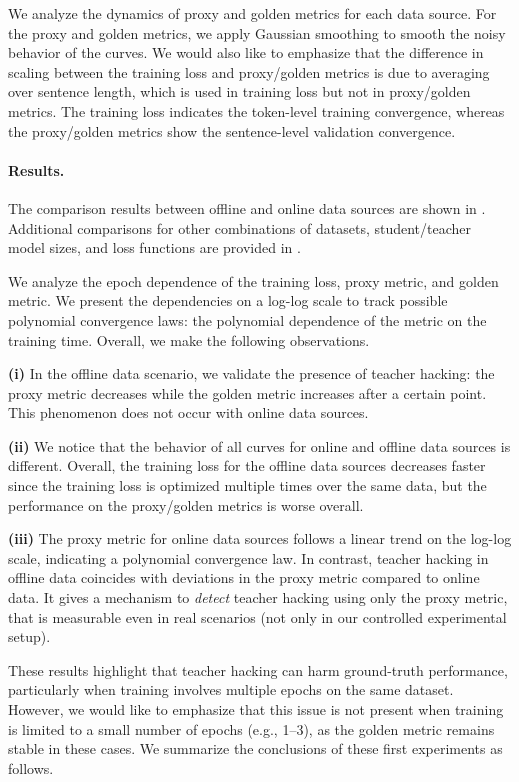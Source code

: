 We analyze the dynamics of proxy and golden metrics for each data source. For the proxy and golden metrics, we apply Gaussian smoothing to smooth the noisy behavior of the curves. We would also like to emphasize that the difference in scaling between the training loss and proxy/golden metrics is due to averaging over sentence length, which is used in training loss but not in proxy/golden metrics. The training loss indicates the token-level training convergence, whereas the proxy/golden metrics show the sentence-level validation convergence.   


\paragraph{Results.} 

The comparison results between offline and online data sources are shown in . Additional comparisons for other combinations of datasets, student/teacher model sizes, and loss functions are provided in .


We analyze the epoch dependence of the training loss, proxy metric, and golden metric. We present the dependencies on a log-log scale to track possible polynomial convergence laws: the polynomial dependence of the metric on the training time. Overall, we make the following observations.


\textbf{(i)} In the offline data scenario, we validate the presence of teacher hacking: the proxy metric decreases while the golden metric increases after a certain point. This phenomenon does not occur with online data sources.

\textbf{(ii)} We notice that the behavior of all curves for online and offline data sources is different. Overall, the training loss for the offline data sources decreases faster since the training loss is optimized multiple times over the same data, but the performance on the proxy/golden metrics is worse overall.

\textbf{(iii)} The proxy metric for online data sources follows a linear trend on the log-log scale, indicating a polynomial convergence law. In contrast, teacher hacking in offline data coincides with deviations in the proxy metric compared to online data. It gives a mechanism to \textit{detect} teacher hacking using only the proxy metric, that is measurable even in real scenarios (not only in our controlled experimental setup).


These results highlight that teacher hacking can harm ground-truth performance, particularly when training involves multiple epochs on the same dataset. However, we would like to emphasize that this issue is not present when training is limited to a small number of epochs (e.g., 1–3), as the golden metric remains stable in these cases. We summarize the conclusions of these first experiments as follows.



